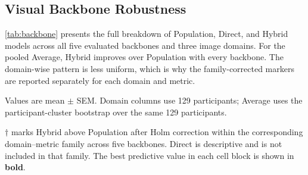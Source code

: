 \documentclass[10pt,twocolumn,letterpaper]{article}
\begin{document}
\subsection{Visual Backbone Robustness}
\cref{tab:backbone} presents the full breakdown of Population, Direct, and Hybrid models across all five evaluated backbones and three image domains.
For the pooled Average, Hybrid improves over Population with every backbone.
The domain-wise pattern is less uniform, which is why the family-corrected
markers are reported separately for each domain and metric.
\begin{table}[tbp]
\centering
\footnotesize
\setlength{\tabcolsep}{3.5pt}
\caption{Population, Direct, and Hybrid ridge models across visual backbones
and domains.}
\label{tab:backbone}
\begin{threeparttable}
    
    \begin{tablenotes}[flushleft]\footnotesize
    \item Values are mean $\pm$ SEM. Domain columns use 129 participants; Average uses the participant-cluster bootstrap over the same 129 participants.
    \item $\dagger$ marks Hybrid above Population after Holm correction within the corresponding domain--metric family across five backbones. Direct is descriptive and is not included in that family. The best predictive value in each cell block is shown in \textbf{bold}.
    \end{tablenotes}
\end{threeparttable}
\end{table}
\end{document}
